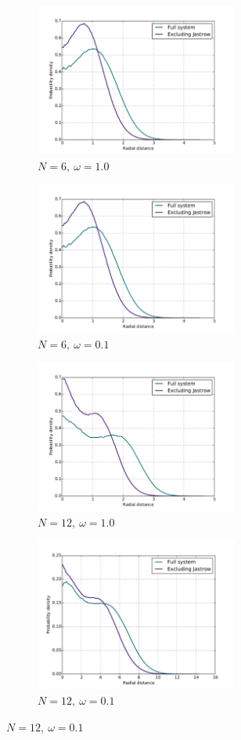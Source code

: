 \documentclass[english, a4paper]{article}
\begin{document}
\begin{figure}[H]
		\begin{subfigure}{0.5\textwidth}
			\includegraphics[width=\textwidth, height= 5cm]{figures/radialDistribution/OneBodyDensityN6w100Se7.pdf}
			\caption{$N=6,\:\omega=1.0$}
		\end{subfigure}
		\begin{subfigure}{0.5\textwidth}
			\includegraphics[width=\textwidth, height= 5cm]{figures/radialDistribution/OneBodyDensityN6w100Se7.pdf}
			\caption{$N=6,\:\omega=0.1$}
		\end{subfigure}
		
		\vspace{1mm}
		
		\begin{subfigure}{0.5\textwidth}
			\includegraphics[width=\textwidth, height=5cm]{figures/radialDistribution/OneBodyDensityN12w100Se7.pdf}
			\caption{$N=12,\:\omega=1.0$}
		\end{subfigure}
		\begin{subfigure}{0.5\textwidth}
			\includegraphics[width=\textwidth, height= 5cm]{figures/radialDistribution/OneBodyDensityN12w10Se7.pdf}
			\caption{$N=12,\:\omega=0.1$}
		\end{subfigure}
		

\end{figure}
\end{document}
